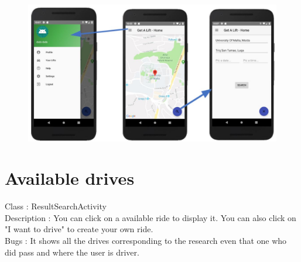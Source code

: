 \begin{figure}[h!]
\begin{center}
\includegraphics[scale = 0.6]{diagrams/HomePage_gal.JPG} 
\end{center}
\end{figure}

\section{Available drives}
Class : ResultSearchActivity \\
Description : You can click on a available ride to display it. You can also click on "I want to drive" to create your own ride. \\
Bugs : It shows all the drives corresponding to the research even that one who did pass and where the user is driver.

